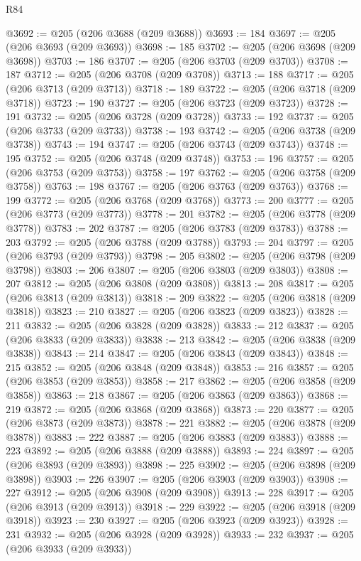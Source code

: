 \begin{lexlean}{R84}
\begin{coremodule}
@3692 := @205 (@206 @3688 (@209 @3688))
@3693 := 184
@3697 := @205 (@206 @3693 (@209 @3693))
@3698 := 185
@3702 := @205 (@206 @3698 (@209 @3698))
@3703 := 186
@3707 := @205 (@206 @3703 (@209 @3703))
@3708 := 187
@3712 := @205 (@206 @3708 (@209 @3708))
@3713 := 188
@3717 := @205 (@206 @3713 (@209 @3713))
@3718 := 189
@3722 := @205 (@206 @3718 (@209 @3718))
@3723 := 190
@3727 := @205 (@206 @3723 (@209 @3723))
@3728 := 191
@3732 := @205 (@206 @3728 (@209 @3728))
@3733 := 192
@3737 := @205 (@206 @3733 (@209 @3733))
@3738 := 193
@3742 := @205 (@206 @3738 (@209 @3738))
@3743 := 194
@3747 := @205 (@206 @3743 (@209 @3743))
@3748 := 195
@3752 := @205 (@206 @3748 (@209 @3748))
@3753 := 196
@3757 := @205 (@206 @3753 (@209 @3753))
@3758 := 197
@3762 := @205 (@206 @3758 (@209 @3758))
@3763 := 198
@3767 := @205 (@206 @3763 (@209 @3763))
@3768 := 199
@3772 := @205 (@206 @3768 (@209 @3768))
@3773 := 200
@3777 := @205 (@206 @3773 (@209 @3773))
@3778 := 201
@3782 := @205 (@206 @3778 (@209 @3778))
@3783 := 202
@3787 := @205 (@206 @3783 (@209 @3783))
@3788 := 203
@3792 := @205 (@206 @3788 (@209 @3788))
@3793 := 204
@3797 := @205 (@206 @3793 (@209 @3793))
@3798 := 205
@3802 := @205 (@206 @3798 (@209 @3798))
@3803 := 206
@3807 := @205 (@206 @3803 (@209 @3803))
@3808 := 207
@3812 := @205 (@206 @3808 (@209 @3808))
@3813 := 208
@3817 := @205 (@206 @3813 (@209 @3813))
@3818 := 209
@3822 := @205 (@206 @3818 (@209 @3818))
@3823 := 210
@3827 := @205 (@206 @3823 (@209 @3823))
@3828 := 211
@3832 := @205 (@206 @3828 (@209 @3828))
@3833 := 212
@3837 := @205 (@206 @3833 (@209 @3833))
@3838 := 213
@3842 := @205 (@206 @3838 (@209 @3838))
@3843 := 214
@3847 := @205 (@206 @3843 (@209 @3843))
@3848 := 215
@3852 := @205 (@206 @3848 (@209 @3848))
@3853 := 216
@3857 := @205 (@206 @3853 (@209 @3853))
@3858 := 217
@3862 := @205 (@206 @3858 (@209 @3858))
@3863 := 218
@3867 := @205 (@206 @3863 (@209 @3863))
@3868 := 219
@3872 := @205 (@206 @3868 (@209 @3868))
@3873 := 220
@3877 := @205 (@206 @3873 (@209 @3873))
@3878 := 221
@3882 := @205 (@206 @3878 (@209 @3878))
@3883 := 222
@3887 := @205 (@206 @3883 (@209 @3883))
@3888 := 223
@3892 := @205 (@206 @3888 (@209 @3888))
@3893 := 224
@3897 := @205 (@206 @3893 (@209 @3893))
@3898 := 225
@3902 := @205 (@206 @3898 (@209 @3898))
@3903 := 226
@3907 := @205 (@206 @3903 (@209 @3903))
@3908 := 227
@3912 := @205 (@206 @3908 (@209 @3908))
@3913 := 228
@3917 := @205 (@206 @3913 (@209 @3913))
@3918 := 229
@3922 := @205 (@206 @3918 (@209 @3918))
@3923 := 230
@3927 := @205 (@206 @3923 (@209 @3923))
@3928 := 231
@3932 := @205 (@206 @3928 (@209 @3928))
@3933 := 232
@3937 := @205 (@206 @3933 (@209 @3933))

\end{coremodule}
\end{lexlean}
